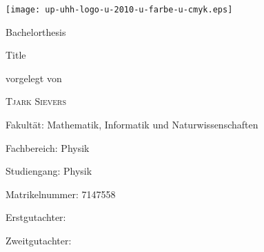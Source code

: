 \documentclass[\main/main.tex]{subfiles}
\begin{document}
\begin{titlepage}
    \texttt{[image: up-uhh-logo-u-2010-u-farbe-u-cmyk.eps]}\par
    \vspace{4\baselineskip}

    \begin{center}
        {\Large\textcolor{uhhred}{Bachelorthesis}\par}

        {\Huge Title\par}

        \vspace{4\baselineskip}

        vorgelegt von\par

        {\Large\textsc{Tjark Sievers}\par}
    \end{center}

    \vfill

    Fakultät: Mathematik, Informatik und Naturwissenschaften\par
    Fachbereich: Physik\par
    Studiengang: Physik\par
    Matrikelnummer: 7147558\par
 
    Erstgutachter: \par
    Zweitgutachter: \par
\end{titlepage}
\end{document}
